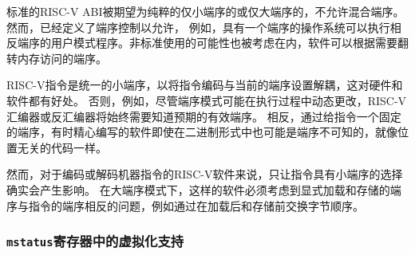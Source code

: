 \begin{commentary}
标准的RISC-V ABI被期望为纯粹的仅小端序的或仅大端序的，不允许混合端序。然而，已经定义了端序控制以允许，
例如，具有一个端序的操作系统可以执行相反端序的用户模式程序。非标准使用的可能性也被考虑在内，软件可以根据需要翻转内存访问的端序。
\end{commentary}

\iffalse
\begin{commentary}
RISC-V instructions are uniformly little-endian to decouple instruction
encoding from the current endianness settings, for the benefit of both
hardware and software.
Otherwise, for instance, a RISC-V assembler or disassembler would always
need to know the intended active endianness, despite that the endianness
mode might change dynamically during execution.
In contrast, by giving instructions a fixed endianness, it is sometimes
possible for carefully written software to be endianness-agnostic even in
binary form, much like position-independent code.

The choice to have instructions be only little-endian does have
consequences, however, for RISC-V software that encodes or decodes
machine instructions.
In big-endian mode, such software must account for the fact that explicit
loads and stores have endianness opposite that of instructions, for
example by swapping byte order after loads and before stores.
\end{commentary}
\fi

\begin{commentary}
RISC-V指令是统一的小端序，以将指令编码与当前的端序设置解耦，这对硬件和软件都有好处。
否则，例如，尽管端序模式可能在执行过程中动态更改，RISC-V汇编器或反汇编器将始终需要知道预期的有效端序。
相反，通过给指令一个固定的端序，有时精心编写的软件即使在二进制形式中也可能是端序不可知的，就像位置无关的代码一样。

然而，对于编码或解码机器指令的RISC-V软件来说，只让指令具有小端序的选择确实会产生影响。
在大端序模式下，这样的软件必须考虑到显式加载和存储的端序与指令的端序相反的问题，例如通过在加载后和存储前交换字节顺序。
\end{commentary}

\subsubsection{{\tt mstatus}寄存器中的虚拟化支持}
\label{virt-control}

